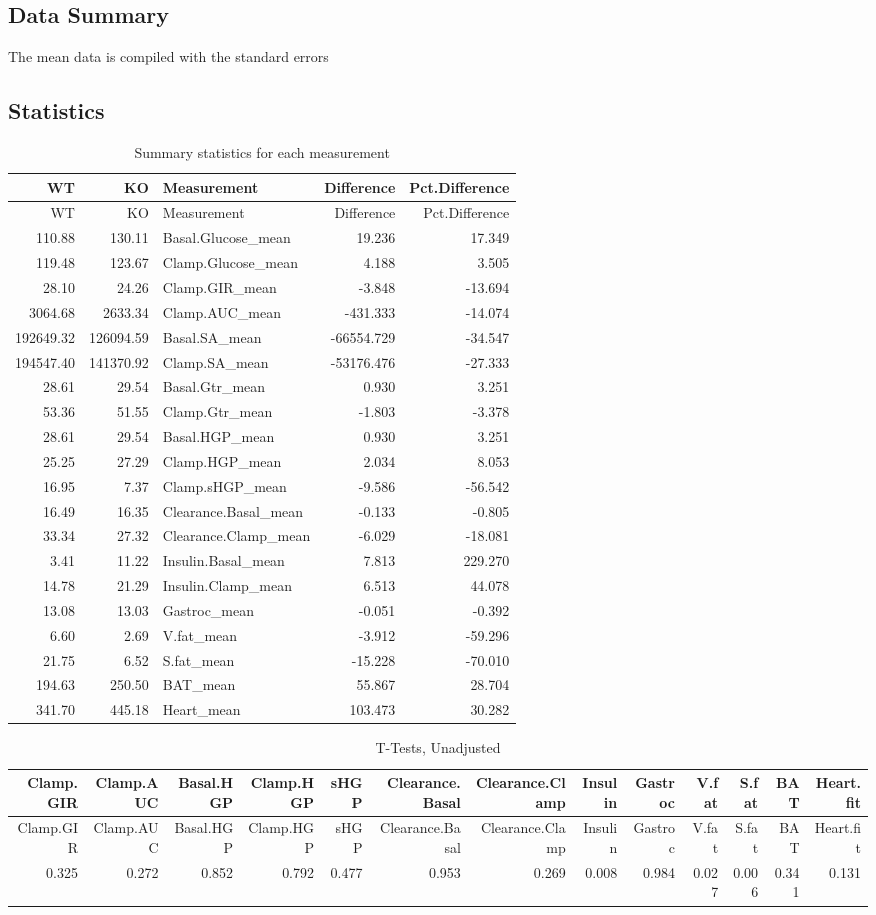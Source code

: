 \documentclass[]{article}
\begin{document}
\subsection{Data Summary}\label{data-summary}

The mean data is compiled with the standard errors

\subsection{Statistics}\label{statistics}

\begin{longtable}[]{@{}rrlrr@{}}
\caption{Summary statistics for each measurement}\tabularnewline
\toprule
WT & KO & Measurement & Difference & Pct.Difference\tabularnewline
\midrule
\endfirsthead
\toprule
WT & KO & Measurement & Difference & Pct.Difference\tabularnewline
\midrule
\endhead
110.88 & 130.11 & Basal.Glucose\_mean & 19.236 & 17.349\tabularnewline
119.48 & 123.67 & Clamp.Glucose\_mean & 4.188 & 3.505\tabularnewline
28.10 & 24.26 & Clamp.GIR\_mean & -3.848 & -13.694\tabularnewline
3064.68 & 2633.34 & Clamp.AUC\_mean & -431.333 & -14.074\tabularnewline
192649.32 & 126094.59 & Basal.SA\_mean & -66554.729 &
-34.547\tabularnewline
194547.40 & 141370.92 & Clamp.SA\_mean & -53176.476 &
-27.333\tabularnewline
28.61 & 29.54 & Basal.Gtr\_mean & 0.930 & 3.251\tabularnewline
53.36 & 51.55 & Clamp.Gtr\_mean & -1.803 & -3.378\tabularnewline
28.61 & 29.54 & Basal.HGP\_mean & 0.930 & 3.251\tabularnewline
25.25 & 27.29 & Clamp.HGP\_mean & 2.034 & 8.053\tabularnewline
16.95 & 7.37 & Clamp.sHGP\_mean & -9.586 & -56.542\tabularnewline
16.49 & 16.35 & Clearance.Basal\_mean & -0.133 & -0.805\tabularnewline
33.34 & 27.32 & Clearance.Clamp\_mean & -6.029 & -18.081\tabularnewline
3.41 & 11.22 & Insulin.Basal\_mean & 7.813 & 229.270\tabularnewline
14.78 & 21.29 & Insulin.Clamp\_mean & 6.513 & 44.078\tabularnewline
13.08 & 13.03 & Gastroc\_mean & -0.051 & -0.392\tabularnewline
6.60 & 2.69 & V.fat\_mean & -3.912 & -59.296\tabularnewline
21.75 & 6.52 & S.fat\_mean & -15.228 & -70.010\tabularnewline
194.63 & 250.50 & BAT\_mean & 55.867 & 28.704\tabularnewline
341.70 & 445.18 & Heart\_mean & 103.473 & 30.282\tabularnewline
\bottomrule
\end{longtable}

\begin{longtable}[]{@{}rrrrrrrrrrrrr@{}}
\caption{T-Tests, Unadjusted}\tabularnewline
\toprule
Clamp.GIR & Clamp.AUC & Basal.HGP & Clamp.HGP & sHGP & Clearance.Basal &
Clearance.Clamp & Insulin & Gastroc & V.fat & S.fat & BAT &
Heart.fit\tabularnewline
\midrule
\endfirsthead
\toprule
Clamp.GIR & Clamp.AUC & Basal.HGP & Clamp.HGP & sHGP & Clearance.Basal &
Clearance.Clamp & Insulin & Gastroc & V.fat & S.fat & BAT &
Heart.fit\tabularnewline
\midrule
\endhead
0.325 & 0.272 & 0.852 & 0.792 & 0.477 & 0.953 & 0.269 & 0.008 & 0.984 &
0.027 & 0.006 & 0.341 & 0.131\tabularnewline
\bottomrule
\end{longtable}
\end{document}
